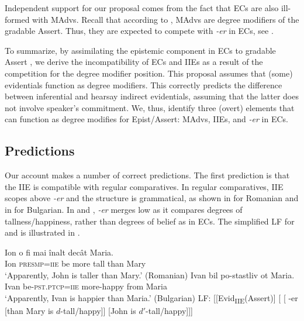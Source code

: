 \documentclass[output=paper,
]{langscibook}
\begin{document}
\noindent Independent support for our proposal comes from the fact that ECs are also ill-formed with MAdvs. Recall that according to \citet{grewol17}, MAdvs are degree modifiers of the gradable Assert. Thus, they are expected to compete with \textit{-er} in ECs, see . 

   \label{rompblec}
    \z 
     
\noindent To summarize, by assimilating the epistemic component in ECs to gradable Assert \citep{grewol17}, we derive the incompatibility of ECs and IIEs as a result of the competition for the degree modifier position. This proposal assumes that (some) evidentials function as degree modifiers. This correctly predicts the difference between inferential and hearsay indirect evidentials, assuming that the latter does not involve speaker's commitment. We, thus, identify three (overt) elements that can function as degree modifies for Epist/Assert: MAdvs, IIEs, and \textit{-er} in ECs.


\subsection{Predictions}\label{sec:predictions}
 Our account makes a number of correct predictions. The first prediction is that the IIE is compatible with regular comparatives. In regular comparatives, IIE scopes above \textit{-er} and the structure is grammatical, as  shown in  for Romanian and in  for Bulgarian. In  and , \textit{-er} merges low as it compares degrees of tallness/happiness, rather than degrees of belief as in ECs. The simplified LF for   and  is illustrated in . 

	\ea \ea \gll Ion  o 		fi 		mai	\^inalt 	decât	Maria. \\ 
		Ion \textsc{presmp=iie}	be more	tall than Mary \\ 
		\glt `Apparently, John is taller than Mary.' \hfill (Romanian) \label{lowera}
    	\ex \gll Ivan bil po-stastliv ot Maria. \\
 		Ivan be-\textsc{pst.ptcp=iie} more-happy from Maria \\	
		\glt `Apparently, Ivan is happier than Maria.' \hfill (Bulgarian) \label{lowerb}
    	\ex LF: [[Evid\textsubscript{IIE}(Assert)] [ [ -er [than Mary is $d$-tall/happy]] [John is $d'$-tall/happy]]] \label{lowerc}
        \z \z
    
\end{document}
